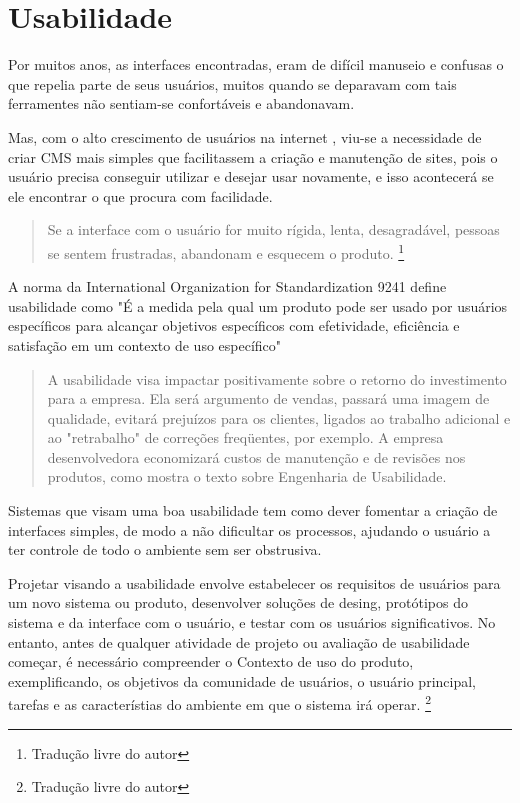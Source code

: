 \chapter{Usabilidade}

Por muitos anos, as interfaces encontradas, eram de difícil manuseio e confusas o que repelia parte de seus usuários, muitos quando se deparavam com tais ferramentes não sentiam-se confortáveis e abandonavam.

Mas, com o alto crescimento de usuários na internet \cite{internet_stats}, viu-se a necessidade de criar CMS mais simples que facilitassem a criação e manutenção de sites, pois o usuário precisa conseguir utilizar e desejar usar novamente, e isso acontecerá se ele encontrar o que procura com facilidade.

\begin{quote} 
Se a interface com o usuário for muito rígida, lenta, desagradável, pessoas se sentem frustradas, abandonam e esquecem o produto.
\cite{usability_evaluation_learning}\footnote{Tradução livre do autor}
\end{quote}

A norma da International Organization for Standardization 9241 define usabilidade como "É a medida pela qual um produto pode ser usado por usuários específicos para alcançar objetivos específicos com efetividade, eficiência e satisfação em um contexto de uso específico"

\begin{quote}
A usabilidade visa impactar positivamente sobre o retorno do investimento para a empresa. Ela será argumento de vendas, passará uma imagem de qualidade, evitará prejuízos para os clientes, ligados ao trabalho adicional e ao "retrabalho" de correções freqüentes, por exemplo. A empresa desenvolvedora economizará custos de manutenção e de revisões nos produtos, como mostra o texto sobre Engenharia de Usabilidade.
\cite{nielsen_usabilidade}
\end{quote}

Sistemas que visam uma boa usabilidade tem como dever fomentar a criação de interfaces simples, de modo a não dificultar os processos, ajudando o usuário a ter controle de todo o ambiente sem ser obstrusiva.

Projetar visando a usabilidade envolve estabelecer os requisitos de usuários para um novo sistema ou produto, desenvolver soluções de desing, protótipos do sistema e da interface com o usuário, e testar com os usuários significativos. No entanto, antes de qualquer atividade de projeto ou avaliação de usabilidade começar, é necessário compreender o Contexto de uso do produto, exemplificando, os objetivos da comunidade de usuários, o usuário principal, tarefas e as característias do ambiente em que o sistema irá operar.
\cite{maguire_context_of_use}\footnote{Tradução livre do autor}

